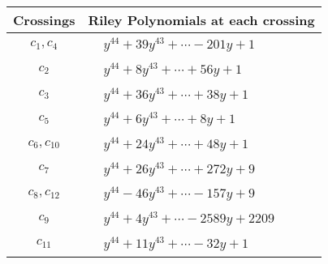 \documentclass[1p]{elsarticle_modified}
\theoremstyle{definition}
\begin{document}
\begin{tabular}{m{50pt}|m{274pt}}
Crossings & \hspace{64pt}Riley Polynomials at each crossing \\
\hline $$\begin{aligned}c_{1},c_{4}\end{aligned}$$&$\begin{aligned}
&y^{44}+39 y^{43}+\cdots-201 y+1
\end{aligned}$\\
\hline $$\begin{aligned}c_{2}\end{aligned}$$&$\begin{aligned}
&y^{44}+8 y^{43}+\cdots+56 y+1
\end{aligned}$\\
\hline $$\begin{aligned}c_{3}\end{aligned}$$&$\begin{aligned}
&y^{44}+36 y^{43}+\cdots+38 y+1
\end{aligned}$\\
\hline $$\begin{aligned}c_{5}\end{aligned}$$&$\begin{aligned}
&y^{44}+6 y^{43}+\cdots+8 y+1
\end{aligned}$\\
\hline $$\begin{aligned}c_{6},c_{10}\end{aligned}$$&$\begin{aligned}
&y^{44}+24 y^{43}+\cdots+48 y+1
\end{aligned}$\\
\hline $$\begin{aligned}c_{7}\end{aligned}$$&$\begin{aligned}
&y^{44}+26 y^{43}+\cdots+272 y+9
\end{aligned}$\\
\hline $$\begin{aligned}c_{8},c_{12}\end{aligned}$$&$\begin{aligned}
&y^{44}-46 y^{43}+\cdots-157 y+9
\end{aligned}$\\
\hline $$\begin{aligned}c_{9}\end{aligned}$$&$\begin{aligned}
&y^{44}+4 y^{43}+\cdots-2589 y+2209
\end{aligned}$\\
\hline $$\begin{aligned}c_{11}\end{aligned}$$&$\begin{aligned}
&y^{44}+11 y^{43}+\cdots-32 y+1
\end{aligned}$\\
\hline
\end{tabular}\\~\\
\end{document}
